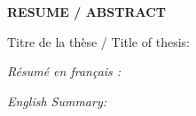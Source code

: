 
\vspace*{-3.5cm}

\begin{center}
\begingroup \fontsize{14}{14}\sffamily\textbf{RESUME / ABSTRACT}  \endgroup
\end{center}

\noindent  \begingroup \fontsize{11}{14}Titre de la thèse / Title of thesis: \MyTitle  \endgroup

\noindent  \begingroup \fontsize{11}{11}\sffamily\textit{Résumé en français :}  \sffamily{
\lipsum[2-2]
}  \endgroup

\noindent    \begingroup \fontsize{11}{11}\sffamily\textit{English Summary:} \sffamily{
\lipsum[4-4]
} \endgroup